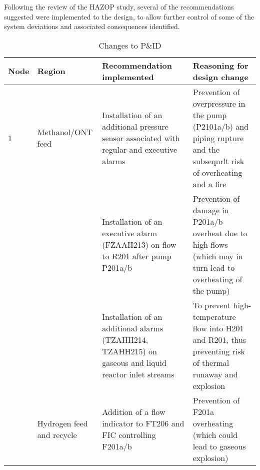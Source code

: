 Following the review of the HAZOP study, several of the recommendations suggested were implemented to the design, to allow further control of some of the system deviations and associated  consequences identified. 

\begin{table}[h]
\centering
\caption{Changes to P\&ID}
\label{tab:PIDchanges}
\footnotesize
\begin{tabularx}{\linewidth}{@{}lp{3cm}XX@{}}
\toprule
Node & Region                    & Recommendation implemented                                                                                                                                    & Reasoning for design change                                                                                                                                                                                                                                                  \\ \midrule
1    & Methanol/ONT feed         & Installation of an additional pressure sensor associated with regular and executive alarms                                                                    & Prevention of overpressure in the pump (P2101a/b) and piping rupture and the subseqnrlt risk of overheating and a fire                                                                                     \\ \cmidrule(l){3-4} 
     &                           & Installation of an executive alarm (FZAAH213) on flow to R201 after pump P201a/b                                                                              & Prevention of damage in P201a/b overheat due to high flows (which may in turn lead to overheating of the pump)                                                                                           \\ \cmidrule(l){3-4} 
     &                           & Installation of an additional alarms (TZAHH214, TZAHH215) on gaseous and liquid reactor inlet streams                                                         & To prevent high-temperature flow into H201 and R201, thus preventing risk of thermal runaway and explosion                                                                                               \\ \cmidrule(l){2-4} 
     & Hydrogen feed and recycle & Addition of a flow indicator to FT206 and FIC controlling F201a/b                                                                                             & \multirow[t]{2}{=}{Prevention of F201a overheating (which could lead to gaseous explosion)}                                                                                                                   \\ \cmidrule(lr){3-3}

\end{tabularx}
\end{table}
